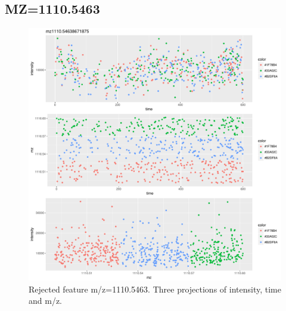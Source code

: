 \documentclass[]{article}
\begin{document}
\subsection{MZ=1110.5463}\label{mz1110.5463}

\begin{figure}[H]
\begin{center}
\includegraphics{Supplementary_document_files/figure-latex/cluster.mz.1110-1.pdf}
\caption{Rejected feature m/z=1110.5463. Three projections of intensity, time and m/z.}
\label{fig:d3.mz.1110.5463}
\end{center}
\end{figure}
\end{document}
